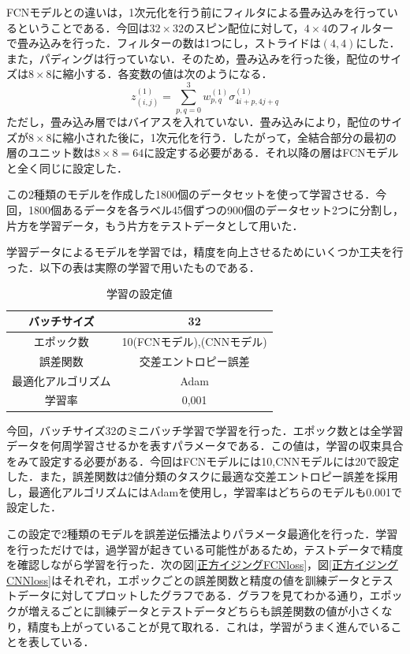 \documentclass[a4paper,11pt]{jsreport}
\begin{document}
FCNモデルとの違いは，1次元化を行う前にフィルタによる畳み込みを行っているということである．今回は$32 \times 32$のスピン配位に対して，$4 \times 4$のフィルターで畳み込みを行った．フィルターの数は1つにし，ストライドは$(4,4)$にした．また，パディングは行っていない．そのため，畳み込みを行った後，配位のサイズは$8 \times 8$に縮小する．各変数の値は次のようになる．
\begin{equation}
  z_{(i,j)}^{(1)}
  = \sum_{p,q=0}^{3} w_{p,q}^{(1)} \sigma_{4i+p,4j+q}^{(1)}
\end{equation}
ただし，畳み込み層ではバイアスを入れていない．畳み込みにより，配位のサイズが$8 \times 8$に縮小された後に，1次元化を行う．したがって，全結合部分の最初の層のユニット数は$8 \times 8 = 64$に設定する必要がある．それ以降の層はFCNモデルと全く同じに設定した．\par
この2種類のモデルを作成した1800個のデータセットを使って学習させる．今回，1800個あるデータを各ラベル45個ずつの900個のデータセット2つに分割し，片方を学習データ，もう片方をテストデータとして用いた．\par
学習データによるモデルを学習では，精度を向上させるためにいくつか工夫を行った．以下の表は実際の学習で用いたものである．

\begin{table}[]
  \centering
  \begin{tabular}{cc} \hline
    バッチサイズ & 32 \rule[0pt]{0pt}{1pt} \\ \hline
    エポック数 & 10(FCNモデル),\quad 20(CNNモデル) \rule[0pt]{0pt}{1pt} \\ \hline
    誤差関数 & 交差エントロピー誤差 \rule[0pt]{0pt}{1pt} \\\hline
    最適化アルゴリズム & Adam \rule[0pt]{0pt}{1pt} \\\hline
    学習率 & 0,001 \rule[0pt]{0pt}{1pt} \\\hline
  \end{tabular}
  \caption{学習の設定値}
  \label{学習で用いたもの}
\end{table}

今回，バッチサイズ32のミニバッチ学習で学習を行った．エポック数とは全学習データを何周学習させるかを表すパラメータである．この値は，学習の収束具合をみて設定する必要がある．今回はFCNモデルには10,CNNモデルには20で設定した．また，誤差関数は2値分類のタスクに最適な交差エントロピー誤差を採用し，最適化アルゴリズムにはAdamを使用し，学習率はどちらのモデルも0.001で設定した．\par
この設定で2種類のモデルを誤差逆伝播法よりパラメータ最適化を行った．学習を行っただけでは，過学習が起きている可能性があるため，テストデータで精度を確認しながら学習を行った．次の図\ref{正方イジングFCNloss}，図\ref{正方イジングCNNloss}はそれぞれ，エポックごとの誤差関数と精度の値を訓練データとテストデータに対してプロットしたグラフである．グラフを見てわかる通り，エポックが増えるごとに訓練データとテストデータどちらも誤差関数の値が小さくなり，精度も上がっていることが見て取れる．これは，学習がうまく進んでいることを表している．
\end{document}
